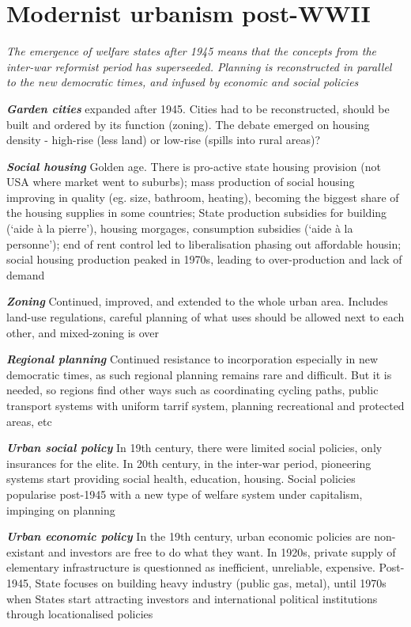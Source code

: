 \documentclass{article}
\newcommand{\bisection}[1]{\textbf{\textit{#1}}}
\newcommand{\alignedmarginpar}[1]{%
        \marginpar{\raggedright\small #1}
    }
\begin{document}
\pagebreak
\section{Modernist urbanism post-WWII}

\textit{The emergence of welfare states after 1945 means that the concepts from the inter-war reformist period has superseeded. Planning is reconstructed in parallel to the new democratic times, and infused by economic and social policies}

\bisection{Garden cities}\alignedmarginpar{New Towns} expanded after 1945. Cities had to be reconstructed, should be built and ordered by its function (zoning). The debate emerged on housing density - high-rise (less land) or low-rise (spills into rural areas)?

\bisection{Social housing}\alignedmarginpar{Policy after 1945} Golden age. There is pro-active state housing provision (not USA where market went to suburbs); mass production of social housing improving in quality (eg. size, bathroom, heating), becoming the biggest share of the housing supplies in some countries; State production subsidies for building (`aide à la pierre'), housing morgages, consumption subsidies (`aide à la personne'); end of rent control led to liberalisation phasing out affordable housin; social housing production peaked in 1970s, leading to over-production and lack of demand

\bisection{Zoning} Continued, improved, and extended to the whole urban area. Includes land-use regulations, careful planning of what uses should be allowed next to each other, and mixed-zoning is over

\bisection{Regional planning} Continued resistance to incorporation especially in new democratic times, as such regional planning remains rare and difficult. But it is needed, so regions find other ways such as coordinating cycling paths, public transport systems with uniform tarrif system, planning recreational and protected areas, etc

\bisection{Urban social policy} In 19th century, there were limited social policies, only insurances for the elite. In 20th century, in the inter-war period, pioneering systems start providing social health, education, housing. Social policies popularise post-1945 with a new type of welfare system under capitalism, impinging on planning

\bisection{Urban economic policy} In the 19th century, urban economic policies are non-existant and investors are free to do what they want. In 1920s, private supply of elementary infrastructure is questionned as inefficient, unreliable, expensive. Post-1945, State focuses on building heavy industry (public gas, metal), until 1970s when States start attracting investors and international political institutions through locationalised policies\alignedmarginpar{UN City Vienna}
\end{document}
